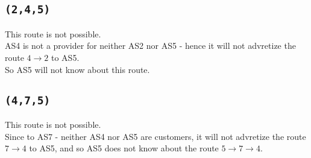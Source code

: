 \subsection{\texttt{(2,4,5)}}
This route is not possible.\\
AS4 is not a provider for neither AS2 nor AS5 - hence
it will not advretize the route $4\rightarrow 2$ to AS5.\\
So AS5 will not know about this route.

\subsection{\texttt{(4,7,5)}}
This route is not possible.\\
Since to AS7 - neither AS4 nor AS5 are customers, it will not advretize
the route $7\rightarrow 4$ to AS5, and so AS5 does not know about the route $5\rightarrow 7\rightarrow 4$.